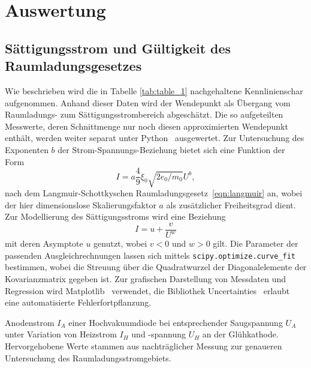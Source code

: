 \section{Auswertung}
\label{sec:auswertung}

\subsection{Sättigungsstrom und Gültigkeit des Raumladungsgesetzes}

Wie beschrieben wird die in Tabelle \ref{tab:table_1} nachgehaltene Kennlinienschar aufgenommen. Anhand dieser Daten
wird der Wendepunkt als Übergang vom Raumladungs- zum Sättigungsstrombereich abgeschätzt. Die so aufgeteilten Messwerte, deren
Schnittmenge nur noch diesen approximierten Wendepunkt enthält, werden weiter separat unter Python~\cite{python} ausgewertet. Zur
Untersuchung des Exponenten $b$ der Strom-Spannungs-Beziehung bietet sich eine Funktion der Form
\begin{equation}
    I = a \frac{4}{9} \xi_0 \sqrt{2 e_0/m_0} U^b ,
	\label{eqn:fit_1}
\end{equation}
nach dem Langmuir-Schottkyschen Raumladungsgesetz~\eqref{eqn:langmuir} an, wobei der hier dimensionslose Skalierungsfaktor $a$
als zusätzlicher Freiheitsgrad dient. Zur Modellierung des Sättigungsstroms wird eine Beziehung
\begin{equation}
	I = u + \frac{v}{U^w}
	\label{eqn:fit_2}
\end{equation}
mit deren Asymptote $u$ genutzt, wobei $v < 0$ und $w > 0$ gilt. Die Parameter der passenden Ausgleichrechnungen lassen sich mittels
\verb+scipy.optimize.curve_fit+ bestimmen, wobei die Streuung über die Quadratwurzel der Diagonalelemente der
Kovarianzmatrix gegeben ist. Zur grafischen Darstellung von Messdaten und Regression wird Matplotlib~\cite{matplotlib} verwendet,
die Bibliothek Uncertainties~\cite{uncertainties} erlaubt eine automatisierte Fehlerfortpflanzung.

\begin{table}[H]
	\caption{Anodenstrom $I_A$ einer Hochvakuumdiode bei entsprechender Saugspannung $U_A$ unter Variation von
			 Heizstrom $I_H$ und -spannung $U_H$ an der Glühkathode. Hervorgehobene Werte stammen aus nachträglicher
			 Messung zur genaueren Untersuchung des Raumladungsstromgebiets.}
	\centering
	
	\label{tab:table_1}
\end{table}

